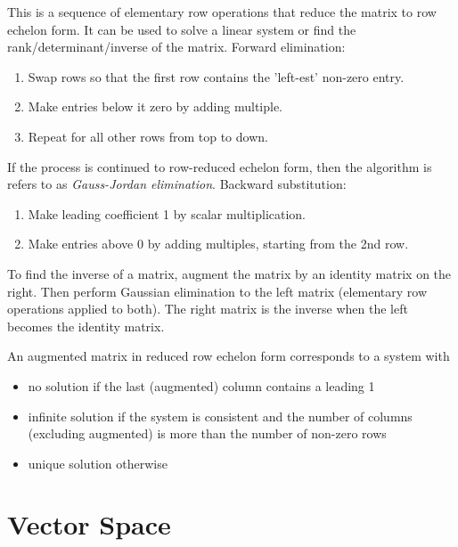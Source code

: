 \documentclass[11pt]{article}
\begin{document}
\begin{algorithm}
  This is a sequence of elementary row operations that reduce the matrix to row echelon form. It can be used to solve a linear system or find the rank/determinant/inverse of the matrix. Forward elimination:
  \begin{enumerate}
    \item Swap rows so that the first row contains the 'left-est' non-zero entry.
    \item Make entries below it zero by adding multiple.
    \item Repeat for all other rows from top to down.
  \end{enumerate}
  If the process is continued to row-reduced echelon form, then the algorithm is refers to as \emph{Gauss-Jordan elimination}. Backward substitution:
  \begin{enumerate}
    \item Make leading coefficient 1 by scalar multiplication.
    \item Make entries above 0 by adding multiples, starting from the 2nd row. 
  \end{enumerate}
\end{algorithm}

To find the inverse of a matrix, augment the matrix by an identity matrix on the right. Then perform Gaussian elimination to the left matrix (elementary row operations applied to both). The right matrix is the inverse when the left becomes the identity matrix. 

\begin{proposition}
  An augmented matrix in reduced row echelon form corresponds to a system with 
  \begin{itemize}
    \item no solution if the last (augmented) column contains a leading 1
    \item infinite solution if the system is consistent and the number of columns (excluding augmented) is more than the number of non-zero rows
    \item unique solution otherwise
  \end{itemize}  
\end{proposition}

\section{Vector Space}
\end{document}
